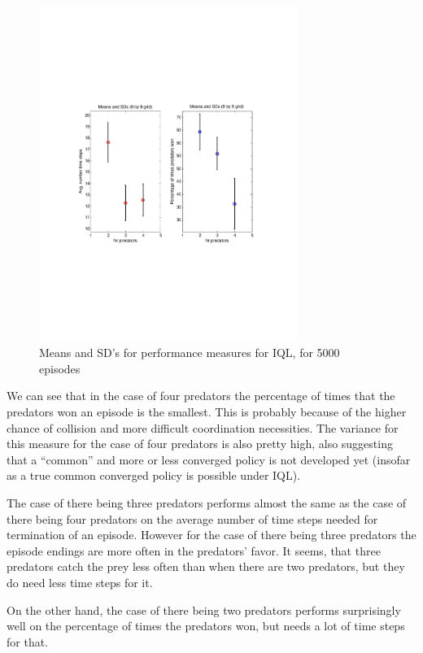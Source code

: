 \begin{figure}[htb]
\centering
\includegraphics[bb = 0.6in 3in 7.9in 8.5in,clip,width=0.75\textwidth]{IQLgrid9by9ErrorBars.pdf} 
\caption{Means and SD's for performance measures for IQL, for 5000 episodes}
\label{fig:IQLmeansSds}
\end{figure}



We can see that in the case of four predators the percentage of times that the predators won an episode is the smallest. This is probably because of the higher chance of collision and more difficult coordination necessities. The variance for this measure for the case of four predators is also pretty high, also suggesting that a  ``common'' and more or less converged policy is not developed yet (insofar as a true common converged policy is possible under IQL). 

The case of there being three predators performs almost the same as the case of there being four predators on the average number of time steps  needed for termination of an episode. However for the case of there being three predators the episode endings are more often in the predators' favor. It seems, that three predators catch the prey less often than when there are two predators, but they do need less time steps for it.
 
On the other hand, the case of there being two predators performs surprisingly well on the percentage of times the predators won, but needs a lot of time steps for that.

